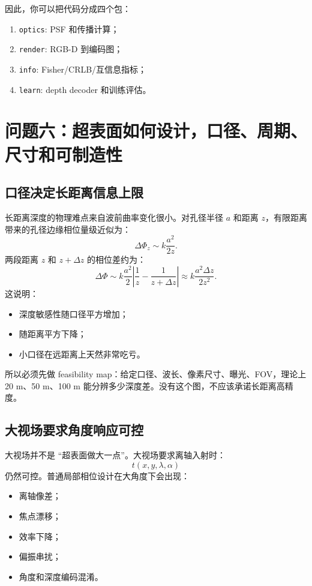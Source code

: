 \documentclass[11pt,a4paper,fontset=none]{ctexart}
\begin{document}
因此，你可以把代码分成四个包：
\begin{enumerate}
  \item \texttt{optics}: PSF 和传播计算；
  \item \texttt{render}: RGB-D 到编码图；
  \item \texttt{info}: Fisher/CRLB/互信息指标；
  \item \texttt{learn}: depth decoder 和训练评估。
\end{enumerate}

\section{问题六：超表面如何设计，口径、周期、尺寸和可制造性}

\subsection{口径决定长距离信息上限}

长距离深度的物理难点来自波前曲率变化很小。对孔径半径 $a$ 和距离 $z$，有限距离带来的孔径边缘相位量级近似为：
\begin{equation}
  \Delta\Phi_z
  \sim
  k\frac{a^2}{2z}.
\end{equation}
两段距离 $z$ 和 $z+\Delta z$ 的相位差约为：
\begin{equation}
  \Delta\Phi
  \sim
  k\frac{a^2}{2}
  \left|
  \frac{1}{z}-\frac{1}{z+\Delta z}
  \right|
  \approx
  k\frac{a^2\Delta z}{2z^2}.
\end{equation}
这说明：
\begin{itemize}
  \item 深度敏感性随口径平方增加；
  \item 随距离平方下降；
  \item 小口径在远距离上天然非常吃亏。
\end{itemize}

所以必须先做 feasibility map：给定口径、波长、像素尺寸、曝光、FOV，理论上 20 m、50 m、100 m 能分辨多少深度差。没有这个图，不应该承诺长距离高精度。

\subsection{大视场要求角度响应可控}

大视场并不是 ``超表面做大一点''。大视场要求离轴入射时：
\begin{equation}
  t(x,y,\lambda,\alpha)
\end{equation}
仍然可控。普通局部相位设计在大角度下会出现：
\begin{itemize}
  \item 离轴像差；
  \item 焦点漂移；
  \item 效率下降；
  \item 偏振串扰；
  \item 角度和深度编码混淆。
\end{itemize}
\end{document}
